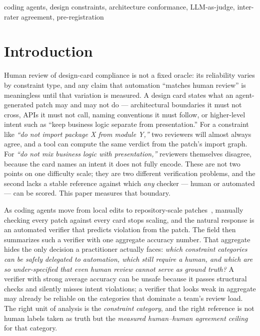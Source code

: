 \documentclass[conference]{IEEEtran}
\begin{document}
\begin{IEEEkeywords}
coding agents, design constraints, architecture conformance, LLM-as-judge,
inter-rater agreement, pre-registration
\end{IEEEkeywords}

\section{Introduction}\label{sec:intro}

Human review of design-card compliance is not a fixed oracle: its reliability
varies by constraint type, and any claim that automation ``matches human
review'' is meaningless until that variation is measured. A design card states
what an agent-generated patch may and may not do --- architectural boundaries it
must not cross, APIs it must not call, naming conventions it must follow, or
higher-level intent such as ``keep business logic separate from presentation.''
For a constraint like \emph{``do not import package X from module Y,''} two
reviewers will almost always agree, and a tool can compute the same verdict from
the patch's import graph. For \emph{``do not mix business logic with
presentation,''} reviewers themselves disagree, because the card names an intent
it does not fully encode. These are not two points on one difficulty scale; they
are two different verification problems, and the second lacks a stable reference
against which \emph{any} checker --- human or automated --- can be scored. This
paper measures that boundary.

As coding agents move from local edits to repository-scale
patches~\cite{jimenez2024swebench,yang2024sweagent}, manually checking every
patch against every card stops scaling, and the natural response is an automated
verifier that predicts violation from the patch. The field then summarizes such
a verifier with one aggregate accuracy number. That aggregate hides the only
decision a practitioner actually faces: \emph{which constraint categories can be
safely delegated to automation, which still require a human, and which are so
under-specified that even human review cannot serve as ground truth?} A verifier
with strong average accuracy can be unsafe because it passes structural checks
and silently misses intent violations; a verifier that looks weak in aggregate
may already be reliable on the categories that dominate a team's review load.
The right unit of analysis is the \emph{constraint category}, and the right
reference is not human labels taken as truth but the \emph{measured human--human
agreement ceiling} for that category.
\end{document}
